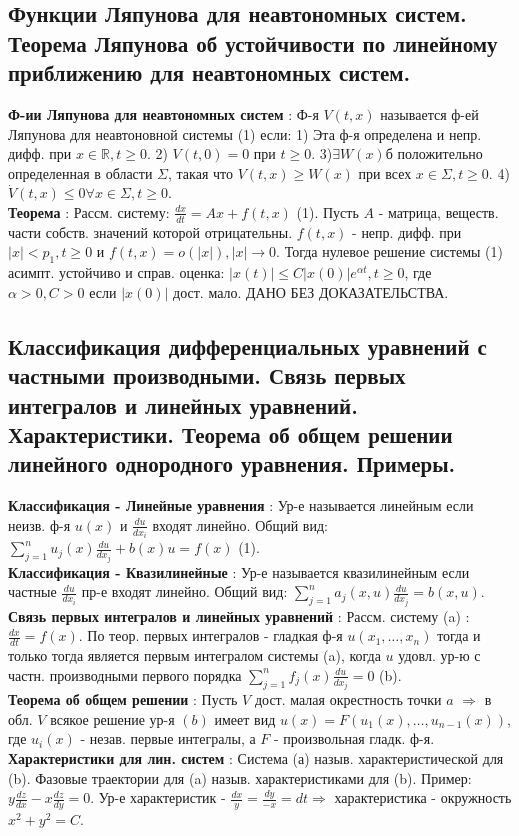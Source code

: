 \documentclass[unicode, 8pt, a4paper,oneside, landscape]{article}
\begin{document}
\begin{multicols}{4}

\subsection{Функции Ляпунова для неавтономных систем. Теорема Ляпунова об устойчивости по линейному приближению для неавтономных систем.}

{\bf Ф-ии Ляпунова для неавтономных систем} : Ф-я $V(t, x)$ называется ф-ей Ляпунова для неавтоновной системы (1) если: 1) Эта ф-я определена и непр. дифф. при $x \in \mathbb{R}, t \geq 0$. 2) $V(t, 0) = 0$ при $t \geq 0$. 3)$\exists W(x)$б положительно определенная в области $\Sigma$, такая что $V(t, x) \geq W(x)$ при всех $x \in \Sigma, t \geq 0$. 4) $\dot{V}(t, x) \leq 0 \forall x \in \Sigma, t\geq 0$.\\
{\bf Теорема} : Рассм. систему: $\frac{dx}{dt} = Ax + f(t, x)$ (1). Пусть $A$ - матрица, веществ. части собств. значений которой отрицательны. $f(t, x)$ - непр. дифф. при $|x| < p_1, t \geq 0$ и $f(t,x) = o(|x|), |x| \to 0$. Тогда нулевое решение системы (1) асимпт. устойчиво и справ. оценка: $|x(t)| \leq C|x(0)|e^{\alpha t}, t \geq 0$, где $\alpha > 0, C > 0$ если $|x(0)|$ дост. мало. ДАНО БЕЗ ДОКАЗАТЕЛЬСТВА.


\subsection{Классификация дифференциальных уравнений с частными производными. Связь первых интегралов и линейных уравнений. Характеристики. Теорема об общем решении линейного однородного уравнения. Примеры.}
{\bf Классификация - Линейные уравнения} : Ур-е называется линейным если неизв. ф-я $u(x)$ и $\frac{du}{dx_i}$ входят линейно. Общий вид: $\sum_{j=1}^n u_j(x) \frac{du}{dx_j} + b(x)u = f(x)$ (1).\\
{\bf Классификация - Квазилинейные} : Ур-е называется квазилинейным если частные $\frac{du}{dx_i}$ пр-е входят линейно. Общий вид: $\sum_{j=1}^n a_j(x, u)\frac{du}{dx_j} = b(x, u)$.\\
{\bf Связь первых интегралов и линейных уравнений} : Рассм. систему (a) : $\frac{dx}{dt} = f(x)$. По теор. первых интегралов - гладкая ф-я $u(x_1, \ldots, x_n)$ тогда и только тогда является первым интегралом системы (a), когда $u$ удовл. ур-ю с частн. производными первого порядка $\sum_{j=1}^n f_j(x)\frac{du}{dx_j} = 0$ (b).\\
{\bf Теорема об общем решении} : Пусть $V$ дост. малая окрестность точки $a$ $\Rightarrow$ в обл. $V$ всякое решение ур-я $(b)$ имеет вид $u(x) = F(u_1(x), \ldots, u_{n-1}(x))$, где $u_i(x)$ - незав. первые интегралы, а $F$ - произвольная гладк. ф-я.\\
{\bf Характеристики для лин. систем} : Система (а) назыв. характеристической для (b). Фазовые траектории для (a) назыв. характеристиками для (b). Пример: $y\frac{dz}{dx} - x\frac{dz}{dy} = 0$. Ур-е характеристик - $\frac{dx}{y} = \frac{dy}{-x} = dt \Rightarrow$ характеристика - окружность $x^2 + y^2 = C$.


\end{multicols}
\end{document}
